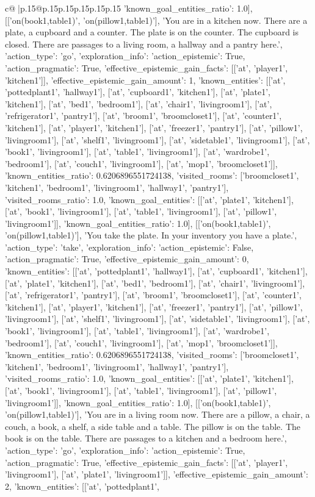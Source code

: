 \documentclass{article}
\begin{document}
{\begin{supertabular}{c@{$\;$}|p{.15\linewidth}@{}p{.15\linewidth}p{.15\linewidth}p{.15\linewidth}p{.15\linewidth}p{.15\linewidth}}
{{{'known_goal_entities_ratio': 1.0}}], [['on(book1,table1)', 'on(pillow1,table1)'], 'You are in a kitchen now. There are a plate, a cupboard and a counter. The plate is on the counter. The cupboard is closed. There are passages to a living room, a hallway and a pantry here.', {'action_type': 'go', 'exploration_info': {'action_epistemic': True, 'action_pragmatic': True, 'effective_epistemic_gain_facts': [['at', 'player1', 'kitchen1']], 'effective_epistemic_gain_amount': 1, 'known_entities': [['at', 'pottedplant1', 'hallway1'], ['at', 'cupboard1', 'kitchen1'], ['at', 'plate1', 'kitchen1'], ['at', 'bed1', 'bedroom1'], ['at', 'chair1', 'livingroom1'], ['at', 'refrigerator1', 'pantry1'], ['at', 'broom1', 'broomcloset1'], ['at', 'counter1', 'kitchen1'], ['at', 'player1', 'kitchen1'], ['at', 'freezer1', 'pantry1'], ['at', 'pillow1', 'livingroom1'], ['at', 'shelf1', 'livingroom1'], ['at', 'sidetable1', 'livingroom1'], ['at', 'book1', 'livingroom1'], ['at', 'table1', 'livingroom1'], ['at', 'wardrobe1', 'bedroom1'], ['at', 'couch1', 'livingroom1'], ['at', 'mop1', 'broomcloset1']], 'known_entities_ratio': 0.6206896551724138, 'visited_rooms': ['broomcloset1', 'kitchen1', 'bedroom1', 'livingroom1', 'hallway1', 'pantry1'], 'visited_rooms_ratio': 1.0, 'known_goal_entities': [['at', 'plate1', 'kitchen1'], ['at', 'book1', 'livingroom1'], ['at', 'table1', 'livingroom1'], ['at', 'pillow1', 'livingroom1']], 'known_goal_entities_ratio': 1.0}}], [['on(book1,table1)', 'on(pillow1,table1)'], 'You take the plate. In your inventory you have a plate.', {'action_type': 'take', 'exploration_info': {'action_epistemic': False, 'action_pragmatic': True, 'effective_epistemic_gain_amount': 0, 'known_entities': [['at', 'pottedplant1', 'hallway1'], ['at', 'cupboard1', 'kitchen1'], ['at', 'plate1', 'kitchen1'], ['at', 'bed1', 'bedroom1'], ['at', 'chair1', 'livingroom1'], ['at', 'refrigerator1', 'pantry1'], ['at', 'broom1', 'broomcloset1'], ['at', 'counter1', 'kitchen1'], ['at', 'player1', 'kitchen1'], ['at', 'freezer1', 'pantry1'], ['at', 'pillow1', 'livingroom1'], ['at', 'shelf1', 'livingroom1'], ['at', 'sidetable1', 'livingroom1'], ['at', 'book1', 'livingroom1'], ['at', 'table1', 'livingroom1'], ['at', 'wardrobe1', 'bedroom1'], ['at', 'couch1', 'livingroom1'], ['at', 'mop1', 'broomcloset1']], 'known_entities_ratio': 0.6206896551724138, 'visited_rooms': ['broomcloset1', 'kitchen1', 'bedroom1', 'livingroom1', 'hallway1', 'pantry1'], 'visited_rooms_ratio': 1.0, 'known_goal_entities': [['at', 'plate1', 'kitchen1'], ['at', 'book1', 'livingroom1'], ['at', 'table1', 'livingroom1'], ['at', 'pillow1', 'livingroom1']], 'known_goal_entities_ratio': 1.0}}], [['on(book1,table1)', 'on(pillow1,table1)'], 'You are in a living room now. There are a pillow, a chair, a couch, a book, a shelf, a side table and a table. The pillow is on the table. The book is on the table. There are passages to a kitchen and a bedroom here.', {'action_type': 'go', 'exploration_info': {'action_epistemic': True, 'action_pragmatic': True, 'effective_epistemic_gain_facts': [['at', 'player1', 'livingroom1'], ['at', 'plate1', 'livingroom1']], 'effective_epistemic_gain_amount': 2, 'known_entities': [['at', 'pottedplant1', }}}
\end{supertabular}}
\end{document}
